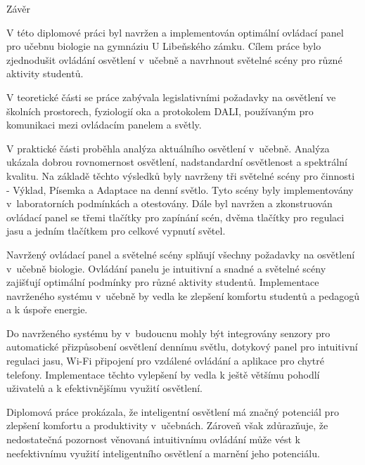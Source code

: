 \nonum\chap Závěr

V této diplomové práci byl navržen a implementován optimální ovládací panel pro učebnu
biologie na gymnáziu U Libeňského zámku.
Cílem práce bylo zjednodušit ovládání osvětlení v~učebně a navrhnout světelné scény pro různé aktivity studentů.


V teoretické části se práce zabývala legislativními požadavky na osvětlení ve školních prostorech,
fyziologií oka a protokolem DALI, používaným pro komunikaci mezi ovládacím panelem a světly.


V praktické části proběhla analýza aktuálního osvětlení v~učebně.
Analýza ukázala dobrou rovnomernost osvětlení, nadstandardní osvětlenost a spektrální kvalitu.
Na základě těchto výsledků byly navrženy tři světelné scény pro činnosti -
Výklad, Písemka a Adaptace na denní světlo.
Tyto scény byly implementovány v~laboratorních podmínkách a otestovány.
Dále byl navržen a zkonstruován ovládací panel se třemi tlačítky pro zapínání scén,
dvěma tlačítky pro regulaci jasu a jedním tlačítkem pro celkové vypnutí světel.


Navržený ovládací panel a světelné scény splňují všechny požadavky na osvětlení v~učebně biologie.
Ovládání panelu je intuitivní a snadné a světelné scény zajišťují optimální podmínky pro různé aktivity studentů.
Implementace navrženého systému v~učebně by vedla ke zlepšení komfortu studentů a pedagogů a k úspoře energie.

Do navrženého systému by v~budoucnu mohly být integrovány senzory pro automatické přizpůsobení
osvětlení dennímu světlu, dotykový panel pro intuitivní regulaci jasu,
Wi-Fi připojení pro vzdálené ovládání a aplikace pro chytré telefony.
Implementace těchto vylepšení by vedla k ještě většímu pohodlí uživatelů a k efektivnějšímu využití osvětlení.


Diplomová práce prokázala, že inteligentní osvětlení má značný potenciál
pro zlepšení komfortu a produktivity v~učebnách.
Zároveň však zdůrazňuje, že nedostatečná pozornost věnovaná
intuitivnímu ovládání může vést k neefektivnímu využití inteligentního osvětlení a marnění jeho potenciálu.






